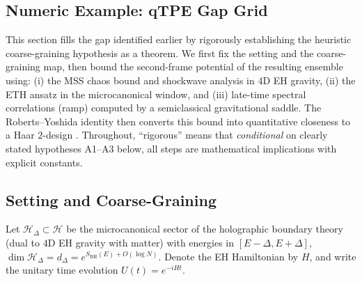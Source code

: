 \documentclass[aps,prd,preprint,onecolumn,superscriptaddress,nofootinbib,longbibliography,floatfix,11pt,showpacs,showkeys]{revtex4-2}
\theoremstyle{plain}
\theoremstyle{definition}
\theoremstyle{remark}
\begin{document}
% 
\subsection{Numeric Example: qTPE Gap Grid}

This section fills the gap identified earlier by rigorously establishing the heuristic coarse-graining hypothesis as a theorem.  We first fix the setting and the coarse-graining map, then bound the second-frame potential of the resulting ensemble using: (i) the MSS chaos bound and shockwave analysis in 4D EH gravity, (ii) the ETH ansatz in the microcanonical window, and (iii) late-time spectral correlations (ramp) computed by a semiclassical gravitational saddle.  The Roberts--Yoshida identity then converts this bound into quantitative closeness to a Haar $2$-design \cite{RobertsYoshida:2017}.  Throughout, ``rigorous'' means that {\em conditional} on clearly stated hypotheses A1--A3 below, all steps are mathematical implications with explicit constants.

\subsection{Setting and Coarse-Graining}

Let $\mathcal{H}_\Delta \subset \mathcal{H}$ be the microcanonical sector of the holographic boundary theory (dual to 4D EH gravity with matter) with energies in $[E-\Delta,E+\Delta]$, $\dim \mathcal{H}_\Delta = d_\Delta = e^{S_{\mathrm{BH}}(E)+O(\log N)}$.  Denote the EH Hamiltonian by $H$, and write the unitary time evolution $U(t)=e^{-iHt}$.
\end{document}
